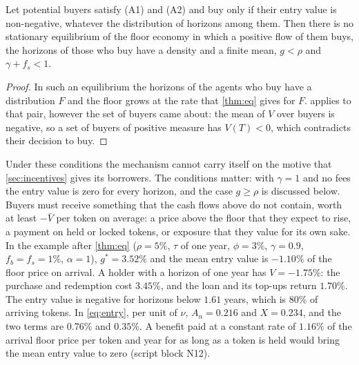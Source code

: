 \begin{corollary}\label{cor:noentry}
Let potential buyers satisfy (A1) and (A2) and buy only if their entry value is non-negative, whatever the distribution of horizons among them. Then there is no stationary equilibrium of the floor economy in which a positive flow of them buys, the horizons of those who buy have a density and a finite mean, $g<\rho$ and $\gamma+f_s<1$.
\end{corollary}
\begin{proof}
In such an equilibrium the horizons of the agents who buy have a distribution $F$ and the floor grows at the rate that \cref{thm:eq} gives for $F$.  applies to that pair, however the set of buyers came about: the mean of $V$ over buyers is negative, so a set of buyers of positive measure has $V(T)<0$, which contradicts their decision to buy.
\end{proof}

Under these conditions the mechanism cannot carry itself on the motive that \cref{sec:incentives} gives its borrowers. The conditions matter: with $\gamma=1$ and no fees the entry value is zero for every horizon, and the case $g\ge\rho$ is discussed below. Buyers must receive something that the cash flows above do not contain, worth at least $-\bar V$ per token on average: a price above the floor that they expect to rise, a payment on held or locked tokens, or exposure that they value for its own sake. In the example after \cref{thm:eq} ($\rho=5\%$, $\tau$ of one year, $\phi=3\%$, $\gamma=0.9$, $f_b=f_s=1\%$, $\alpha=1$), $g^\ast=3.52\%$ and the mean entry value is $-1.10\%$ of the floor price on arrival. A holder with a horizon of one year has $V=-1.75\%$: the purchase and redemption cost $3.45\%$, and the loan and its top-ups return $1.70\%$. The entry value is negative for horizons below $1.61$ years, which is $80\%$ of arriving tokens. In \eqref{eq:entry}, per unit of $\nu$, $A_n=0.216$ and $X=0.234$, and the two terms are $0.76\%$ and $0.35\%$. A benefit paid at a constant rate of $1.16\%$ of the arrival floor price per token and year for as long as a token is held would bring the mean entry value to zero (script block N12).


